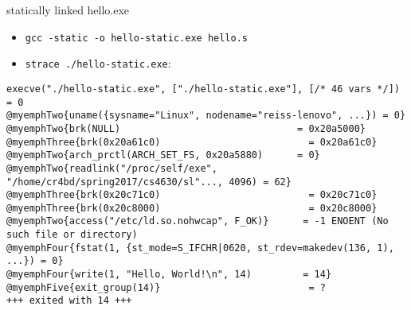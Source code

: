 \begin{frame}[fragile,label=staticStrace]{statically linked hello.exe}
\begin{itemize}
\item \small{\tt gcc -static -o hello-static.exe hello.s}
\item \small{\tt strace ./hello-static.exe}:
\end{itemize}
\begin{Verbatim}[commandchars=@\{\},fontsize=\fontsize{8}{9}\selectfont]
execve("./hello-static.exe", ["./hello-static.exe"], [/* 46 vars */]) = 0
@myemphTwo{uname({sysname="Linux", nodename="reiss-lenovo", ...}) = 0}
@myemphTwo{brk(NULL)                               = 0x20a5000}
@myemphThree{brk(0x20a61c0)                          = 0x20a61c0}
@myemphTwo{arch_prctl(ARCH_SET_FS, 0x20a5880)      = 0}
@myemphTwo{readlink("/proc/self/exe", "/home/cr4bd/spring2017/cs4630/sl"..., 4096) = 62}
@myemphThree{brk(0x20c71c0)                          = 0x20c71c0}
@myemphThree{brk(0x20c8000)                          = 0x20c8000}
@myemphTwo{access("/etc/ld.so.nohwcap", F_OK)}      = -1 ENOENT (No such file or directory)
@myemphFour{fstat(1, {st_mode=S_IFCHR|0620, st_rdev=makedev(136, 1), ...}) = 0}
@myemphFour{write(1, "Hello, World!\n", 14)         = 14}
@myemphFive{exit_group(14)}                          = ?
+++ exited with 14 +++
\end{Verbatim}
\end{frame}

